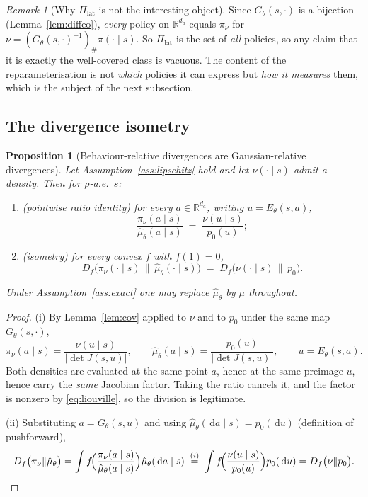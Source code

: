 \documentclass[11pt]{article}
\theoremstyle{plain}
\newtheorem{proposition}[lemma]{Proposition}
\theoremstyle{definition}
\theoremstyle{remark}
\newtheorem{remark}[lemma]{Remark}
\newcommand{\R}{\mathbb R}
\newcommand{\1}{\mathbf 1}
\newcommand{\dd}{\,\mathrm d}
\newcommand{\Gth}{G_\theta}
\newcommand{\Eth}{E_\theta}
\newcommand{\muhat}{\hat\mu_\theta}
\newcommand{\Piclat}{\Pi_{\mathrm{lat}}}
\begin{document}
\begin{remark}[Why $\Piclat$ is not the interesting object]
\label{rem:vacuous}
Since $\Gth(s,\cdot)$ is a bijection (Lemma~\ref{lem:diffeo}), \emph{every} policy on
$\R^{d_a}$ equals $\pi_\nu$ for $\nu=(\Gth(s,\cdot)^{-1})_\#\pi(\cdot\mid s)$. So
$\Piclat$ is the set of \emph{all} policies, so any claim that it is exactly the
well-covered class is vacuous. The content of the reparameterisation is not
\emph{which} policies it can express but \emph{how it measures} them, which is the subject
of the next subsection.
\end{remark}

\subsection{The divergence isometry}

\begin{proposition}[Behaviour-relative divergences are Gaussian-relative divergences]
\label{prop:isometry}
Let Assumption~\ref{ass:lipschitz} hold and let $\nu(\cdot\mid s)$ admit a density. Then
for $\rho$-a.e.\ $s$:
\begin{enumerate}
\item[(i)] \textup{(pointwise ratio identity)} for every $a\in\R^{d_a}$, writing
  $u=\Eth(s,a)$,
  \begin{equation}
  \label{eq:ratio}
    \frac{\pi_\nu(a\mid s)}{\muhat(a\mid s)}\;=\;\frac{\nu(u\mid s)}{p_0(u)} ;
  \end{equation}
\item[(ii)] \textup{(isometry)} for every convex $f$ with $f(1)=0$,
  \begin{equation}
  \label{eq:isometry}
    D_f\big(\pi_\nu(\cdot\mid s)\,\big\|\,\muhat(\cdot\mid s)\big)
    \;=\;D_f\big(\nu(\cdot\mid s)\,\big\|\,p_0\big).
  \end{equation}
\end{enumerate}
Under Assumption~\ref{ass:exact} one may replace $\muhat$ by $\mu$ throughout.
\end{proposition}

\begin{proof}
(i) By Lemma~\ref{lem:cov} applied to $\nu$ and to $p_0$ under the same map $\Gth(s,\cdot)$,
\[
  \pi_\nu(a\mid s)=\frac{\nu(u\mid s)}{|\det J(s,u)|},
  \qquad
  \muhat(a\mid s)=\frac{p_0(u)}{|\det J(s,u)|},
  \qquad u=\Eth(s,a).
\]
Both densities are evaluated at the same point $a$, hence at the same preimage $u$, hence
carry the \emph{same} Jacobian factor. Taking the ratio cancels it, and the factor is
nonzero by \eqref{eq:liouville}, so the division is legitimate.

(ii) Substituting $a=\Gth(s,u)$ and using $\muhat(\dd a\mid s)=p_0(\dd u)$ (definition of
pushforward),
\[
  D_f\big(\pi_\nu\|\muhat\big)
  =\int f\!\Big(\frac{\pi_\nu(a\mid s)}{\muhat(a\mid s)}\Big)\muhat(\dd a\mid s)
  \;\overset{(i)}{=}\;\int f\!\Big(\frac{\nu(u\mid s)}{p_0(u)}\Big)p_0(\dd u)
  =D_f\big(\nu\|p_0\big).\qedhere
\]
\end{proof}
\end{document}
